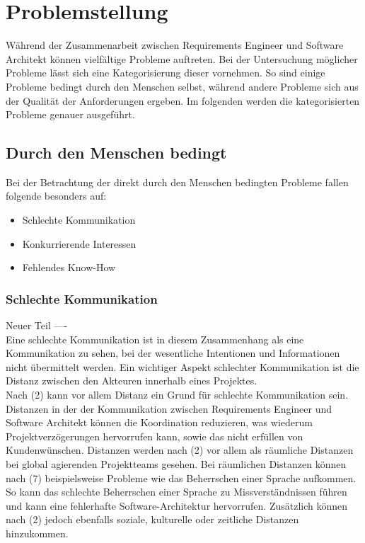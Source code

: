 \section{Problemstellung}
Während der Zusammenarbeit zwischen Requirements Engineer und Software Architekt können vielfältige Probleme auftreten. Bei der Untersuchung möglicher Probleme lässt sich eine Kategorisierung dieser vornehmen. So sind einige Probleme bedingt durch den Menschen selbst, während andere Probleme sich aus der Qualität der Anforderungen ergeben. Im folgenden werden die kategorisierten Probleme genauer ausgeführt.

\subsection{Durch den Menschen bedingt}
Bei der Betrachtung der direkt durch den Menschen bedingten Probleme fallen folgende besonders auf:
\begin{itemize} 
\item Schlechte Kommunikation
\item Konkurrierende Interessen
\item Fehlendes Know-How \\
\end{itemize}

\subsubsection{Schlechte Kommunikation}
Neuer Teil ----\\
Eine schlechte Kommunikation ist in diesem Zusammenhang als eine Kommunikation zu sehen, bei der wesentliche Intentionen und Informationen nicht übermittelt werden. Ein wichtiger Aspekt schlechter Kommunikation ist die Distanz zwischen den Akteuren innerhalb eines Projektes.\\

Nach (2) kann vor allem Distanz ein Grund für schlechte Kommunikation sein. Distanzen in der der Kommunikation zwischen Requirements Engineer und Software Architekt können die Koordination reduzieren, was wiederum Projektverzögerungen hervorrufen kann, sowie das nicht erfüllen von Kundenwünschen. Distanzen werden nach (2) vor allem als räumliche Distanzen bei global agierenden Projektteams gesehen. Bei räumlichen Distanzen können nach (7) beispielsweise Probleme wie das Beherrschen einer Sprache aufkommen. So kann das schlechte Beherrschen einer Sprache zu Missverständnissen führen und kann eine fehlerhafte Software-Architektur hervorrufen.  Zusätzlich können nach (2) jedoch ebenfalls soziale, kulturelle oder zeitliche Distanzen hinzukommen.\\

